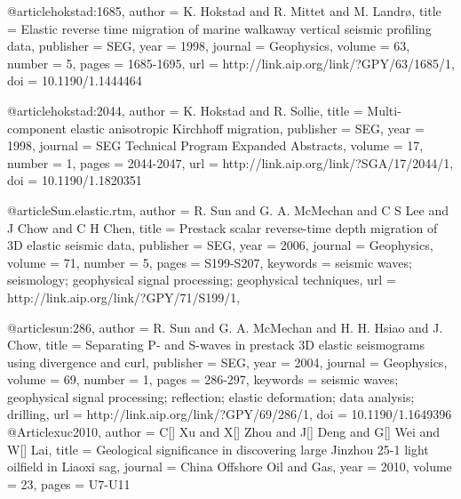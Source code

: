 @article{hokstad:1685,
  author =	 {K. Hokstad and R. Mittet and M. Landr\o},
  title =	 {Elastic reverse time migration of marine walkaway
                  vertical seismic profiling data},
  publisher =	 {SEG},
  year =	 1998,
  journal =	 {Geophysics},
  volume =	 63,
  number =	 5,
  pages =	 {1685-1695},
  url =		 {http://link.aip.org/link/?GPY/63/1685/1},
  doi =		 {10.1190/1.1444464}
}

@article{hokstad:2044,
  author =	 {K. Hokstad and R. Sollie},
  title =	 {Multi-component elastic anisotropic {K}irchhoff
                  migration},
  publisher =	 {SEG},
  year =	 1998,
  journal =	 {SEG Technical Program Expanded Abstracts},
  volume =	 17,
  number =	 1,
  pages =	 {2044-2047},
  url =		 {http://link.aip.org/link/?SGA/17/2044/1},
  doi =		 {10.1190/1.1820351}
}

@article{Sun.elastic.rtm,
  author =	 {R. Sun and G. A. McMechan and C S Lee
                  and J Chow and C H Chen},
  title =	 {Prestack scalar reverse-time depth migration of {3D}
                  elastic seismic data},
  publisher =	 {SEG},
  year =	 2006,
  journal =	 {Geophysics},
  volume =	 71,
  number =	 5,
  pages =	 {S199-S207},
  keywords =	 {seismic waves; seismology; geophysical signal
                  processing; geophysical techniques},
  url =		 {http://link.aip.org/link/?GPY/71/S199/1},
}

@article{sun:286,
  author =	 {R. Sun and G. A. McMechan and H. H. Hsiao
                  and J. Chow},
  title =	 {Separating {P}- and {S}-waves in prestack {3D}
                  elastic seismograms using divergence and curl},
  publisher =	 {SEG},
  year =	 2004,
  journal =	 {Geophysics},
  volume =	 69,
  number =	 1,
  pages =	 {286-297},
  keywords =	 {seismic waves; geophysical signal processing;
                  reflection; elastic deformation; data analysis;
                  drilling},
  url =		 {http://link.aip.org/link/?GPY/69/286/1},
  doi =		 {10.1190/1.1649396}
}
@Article{xuc2010,
  author = 	 {C[] Xu and X[] Zhou and J[] Deng and G[] Wei and W[] Lai},
  title = 	 {Geological significance in discovering large Jinzhou 25-1 light oilfield in Liaoxi sag},
  journal = 	 {China Offshore Oil and Gas},
  year = 	 2010,
  volume = 	 23,
  pages = 	 {U7-U11}}

